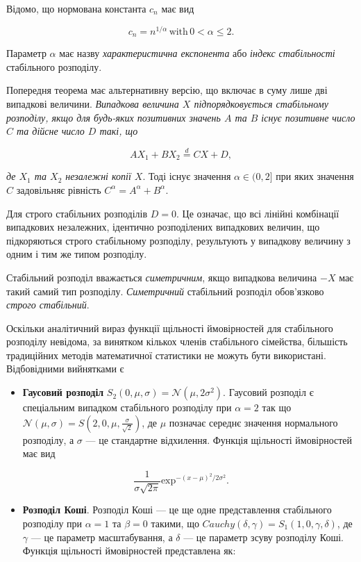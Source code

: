 \documentclass[
  letterpaper,
]{report}
\providecommand{\tightlist}{%
  \setlength{\itemsep}{0pt}\setlength{\parskip}{0pt}}\usepackage{longtable,booktabs,array}
\begin{document}
Відомо, що нормована константа \(c_{n}\) має вид

\[
c_{n} = n^{1/\alpha} \, \text{with} \, 0 < \alpha \leq 2. 
\]

Параметр \(\alpha\) має назву \emph{характеристична експонента} або
\emph{індекс стабільності} стабільного розподілу.

Попередня теорема має альтернативну версію, що включає в суму лише дві
випадкові величини. \emph{Випадкова величина \(X\) підпорядковується
стабільному розподілу, якщо для будь-яких позитивних значень \(A\) та
\(B\) існує позитивне число \(C\) та дійсне число \(D\) такі, що}

\[ 
A X_1 + B X_2 \stackrel{d}{=} C X + D, 
\]

\emph{де \(X_1\) та \(X_2\) незалежні копії \(X\)}. Тоді існує значення
\(\alpha \in (0, 2]\) при яких значення \(C\) задовільняє рівність
\(C^{\alpha} = A^{\alpha} + B^{\alpha}\).

Для строго стабільних розподілів \(D = 0\). Це означає, що всі лінійні
комбінації випадкових незалежних, ідентично розподілених випадкових
величин, що підкоряються строго стабільному розподілу, результують у
випадкову величину з одним і тим же типом розподілу.

Стабільний розподіл вважається \emph{симетричним}, якщо випадкова
величина \(-X\) має такий самий тип розподілу. \emph{Симетричний}
стабільний розподіл обов'язково \emph{строго стабільний}.

Оскільки аналітичний вираз функції щільності ймовірностей для
стабільного розподілу невідома, за винятком кількох членів стабільного
сімейства, більшість традиційних методів математичної статистики не
можуть бути використані. Відбовідними вийнятками є

\begin{itemize}
\tightlist
\item
  \textbf{Гаусовий розподіл}
  \(S_2(0,\mu, \sigma) = \mathcal{N}(\mu, 2\sigma^2)\). Гаусовий
  розподіл є спеціальним випадком стабільного розподілу при
  \(\alpha = 2\) так що
  \(\mathcal{N}(\mu, \sigma) = S(2,0,\mu, \frac{\sigma}{\sqrt{2}})\), де
  \(\mu\) позначає середнє значення нормального розподілу, а \(\sigma\)
  --- це стандартне відхилення. Функція щільності ймовірностей має вид
\end{itemize}

\[ 
\frac{1}{\sigma\sqrt{2\pi}}\text{exp}^{-(x-\mu)^{2}/2\sigma^{2}}. 
\]

\begin{itemize}
\tightlist
\item
  \textbf{Розподіл Коші}. Розподіл Коші --- це ще одне представлення
  стабільного розподілу при \(\alpha = 1\) та \(\beta = 0\) такими, що
  \(Cauchy(\delta, \gamma) = S_1(1,0,\gamma,\delta)\), де \(\gamma\) ---
  це параметр масштабування, а \(\delta\) --- це параметр зсуву
  розподілу Коші. Функція щільності ймовірностей представлена як:
\end{itemize}
\end{document}

